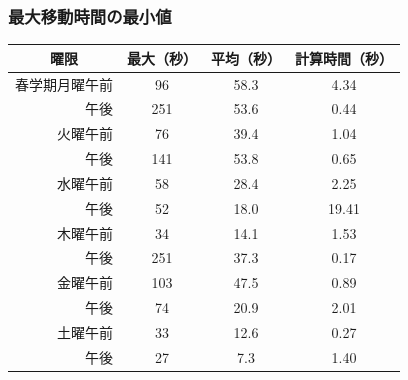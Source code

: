 \documentclass[dvipdfmx,12pt]{beamer}
\begin{document}
\begin{frame}\frametitle{最大移動時間の最小値}
\begin{table}
\begin{center}
\vspace{-5pt}
\begin{tabular}{|r|cc|c|}
\hline
\multicolumn{1}{|c|}{曜限} &  最大（秒）  & 平均（秒） & 計算時間（秒）\\
\hline
春学期月曜午前  & 96  & 58.3 &  4.34\\  
午後            & 251 & 53.6 &  0.44\\
火曜午前        & 76  & 39.4 &  1.04\\
午後            & 141 & 53.8 &  0.65\\
水曜午前        & 58  & 28.4 &  2.25\\
午後            & 52  & 18.0 & 19.41\\
木曜午前        & 34  & 14.1 &  1.53\\
午後            & 251 & 37.3 &  0.17\\
金曜午前        & 103 & 47.5 &  0.89\\
午後            & 74  & 20.9 &  2.01\\
土曜午前        & 33  & 12.6 &  0.27\\
午後            & 27  & 7.3  &  1.40\\
\hline                                        	         
\end{tabular}
\end{center}
\end{table}


\end{frame}
\end{document}
